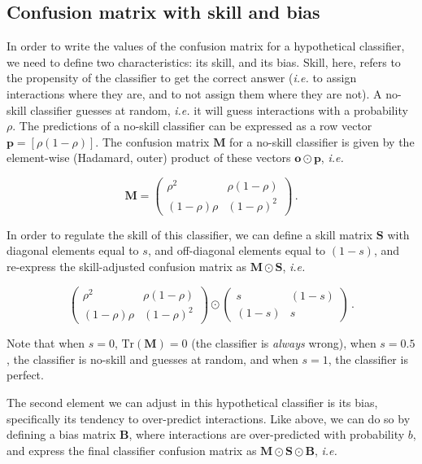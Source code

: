 \documentclass[11pt]{article}
\begin{document}
\hypertarget{confusion-matrix-with-skill-and-bias}{%
\subsection{Confusion matrix with skill and
bias}\label{confusion-matrix-with-skill-and-bias}}

In order to write the values of the confusion matrix for a hypothetical
classifier, we need to define two characteristics: its skill, and its
bias. Skill, here, refers to the propensity of the classifier to get the
correct answer (\emph{i.e.} to assign interactions where they are, and
to not assign them where they are not). A no-skill classifier guesses at
random, \emph{i.e.} it will guess interactions with a probability
\(\rho\). The predictions of a no-skill classifier can be expressed as a
row vector \(\mathbf{p} = [\rho (1-\rho)]\). The confusion matrix
\(\mathbf{M}\) for a no-skill classifier is given by the element-wise
(Hadamard, outer) product of these vectors
\(\mathbf{o} \odot \mathbf{p}\), \emph{i.e.}

\[
\mathbf{M} = \begin{pmatrix}
    \rho^2 & \rho (1-\rho) \\
    (1-\rho) \rho & (1-\rho)^2
\end{pmatrix} \,.
\]

In order to regulate the skill of this classifier, we can define a skill
matrix \(\mathbf{S}\) with diagonal elements equal to \(s\), and
off-diagonal elements equal to \((1-s)\), and re-express the
skill-adjusted confusion matrix as \(\mathbf{M} \odot \mathbf{S}\),
\emph{i.e.}

\[
\begin{pmatrix}
    \rho^2 & \rho (1-\rho) \\
    (1-\rho) \rho & (1-\rho)^2
\end{pmatrix} \odot \begin{pmatrix}
    s & (1-s) \\
    (1-s) & s
\end{pmatrix} \,.
\]

Note that when \(s=0\), \(\text{Tr}(\mathbf{M}) = 0\) (the classifier is
\emph{always} wrong), when \(s=0.5\), the classifier is no-skill and
guesses at random, and when \(s=1\), the classifier is perfect.

The second element we can adjust in this hypothetical classifier is its
bias, specifically its tendency to over-predict interactions. Like
above, we can do so by defining a bias matrix \(\mathbf{B}\), where
interactions are over-predicted with probability \(b\), and express the
final classifier confusion matrix as
\(\mathbf{M}\odot \mathbf{S}\odot \mathbf{B}\), \emph{i.e.}
\end{document}
